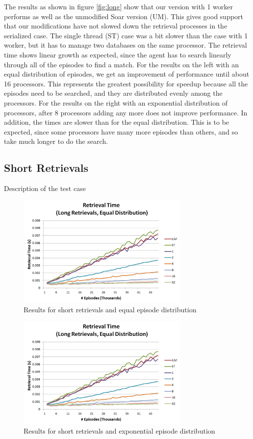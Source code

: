 \documentclass[11pt]{article} %
\begin{document}
The results as shown in figure \ref{fig:long} show that our version with 1 worker performs as well as the unmodified Soar version (UM). 
This gives good support that our modifications have not slowed down the retrieval processes in the serialized case. 
The single thread (ST) case was a bit slower than the case with 1 worker, but it has to manage two databases on the same processor. 
The retrieval time shows linear growth as expected, since the agent has to search linearly through all of the episodes to find a match. 
For the results on the left with an equal distribution of episodes, we get an improvement of performance until about 16 processors. 
This represents the greatest possibility for speedup because all the episodes need to be searched, and they are distributed evenly 
among the processors. For the results on the right with an exponential distribution of processors, after 8 processors adding any more 
does not improve performance. In addition, the times are slower than for the equal distribution. This is to be expected, since some 
processors have many more episodes than others, and so take much longer to do the search. 


\subsection{Short Retrievals}
Description of the test case
\begin{figure}[h]
\caption{Results for short retrievals and equal episode distribution}
\centering
\includegraphics[width=0.75\textwidth]{images/ret_worst_eq}
\end{figure}

\begin{figure}[h]
\caption{Results for short retrievals and exponential episode distribution}
\centering
\includegraphics[width=0.75\textwidth]{images/ret_worst_eq}
\end{figure}
\end{document}
